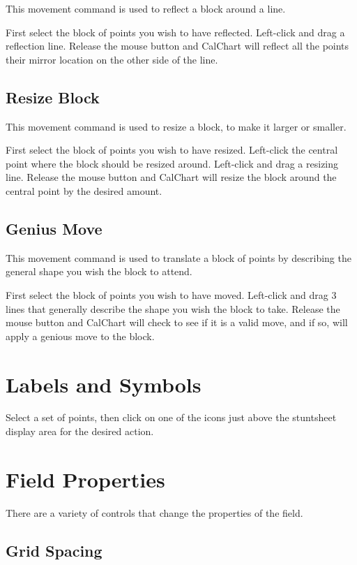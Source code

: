 This movement command is used to reflect a block around a line.

First select the block of points you wish to have reflected.  Left-click and
drag a reflection line.  Release the mouse button and CalChart
will reflect all the points their mirror location on the other side of the line.

\subsection{Resize Block}\label{resizeblock}

This movement command is used to resize a block, to make it larger or smaller.

First select the block of points you wish to have resized.  Left-click the 
central point where the block should be resized around.  Left-click and
drag a resizing line.  Release the mouse button and CalChart
will resize the block around the central point by the desired amount.

\subsection{Genius Move}\label{geniusmove}

This movement command is used to translate a block of points by describing the
general shape you wish the block to attend.

First select the block of points you wish to have moved.  Left-click and drag
3 lines that generally describe the shape you wish the block to take.
Release the mouse button and CalChart will check to see if it is a valid move,
and if so, will apply a genious move to the block.

\section{Labels and Symbols}\label{symbols}

Select a set of points, then click on one of the icons just above the
stuntsheet display area for the desired action.

\section{Field Properties}\label{fieldproperties}

There are a variety of controls that change the properties of the field.

\subsection{Grid Spacing}\label{gridspacing}

